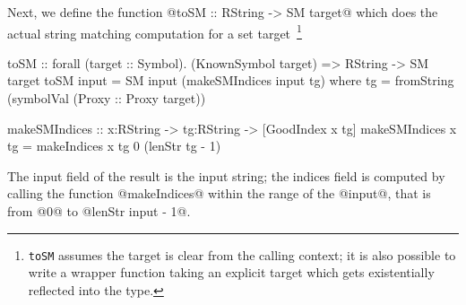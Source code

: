 Next, we define the function @toSM :: RString -> SM target@ which does
the actual string matching computation for a set
target~\footnote{\texttt{toSM} assumes the target is clear from the
  calling context; it is also possible to write a wrapper function
  taking an explicit target which gets existentially reflected into
  the type.}
%
%
\begin{code}
  toSM :: forall (target :: Symbol). (KnownSymbol target)
       => RString -> SM target
  toSM input = SM input (makeSMIndices input tg) where
    tg = fromString (symbolVal (Proxy :: Proxy target))

  makeSMIndices
    :: x:RString -> tg:RString -> [GoodIndex x tg]
  makeSMIndices x tg
    = makeIndices x tg 0 (lenStr tg - 1)
\end{code}
%
The input field of the result is the input string;
the indices field is computed by calling the function @makeIndices@
within the range of the @input@, that is from
@0@ to @lenStr input - 1@.
%

